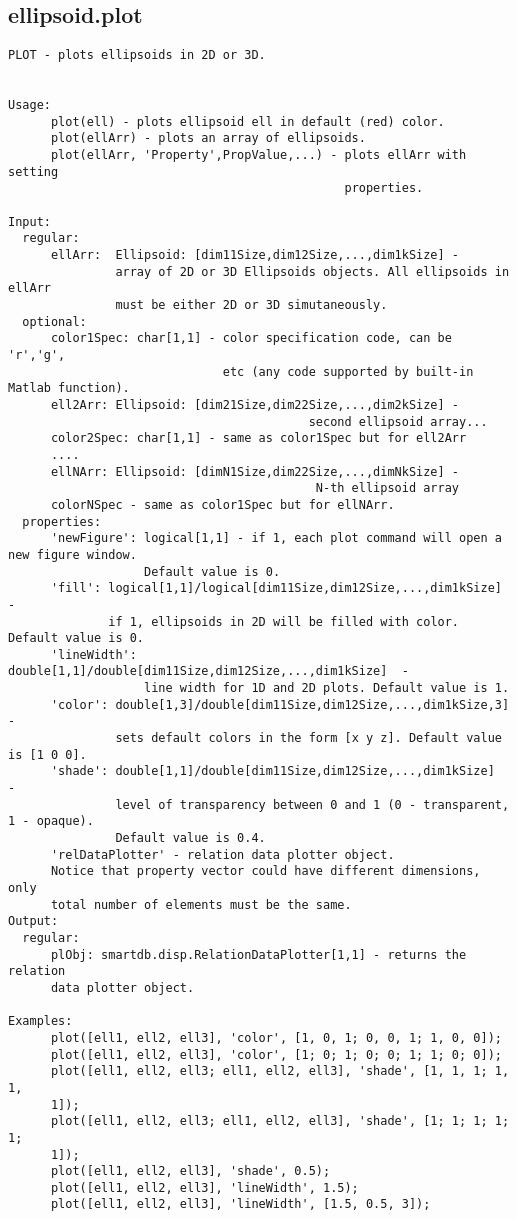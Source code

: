\subsection{\texorpdfstring{ellipsoid.plot}{plot}}\label{method:ellipsoid.plot}
\begin{verbatim}
PLOT - plots ellipsoids in 2D or 3D.


Usage:
      plot(ell) - plots ellipsoid ell in default (red) color.
      plot(ellArr) - plots an array of ellipsoids.
      plot(ellArr, 'Property',PropValue,...) - plots ellArr with setting
                                               properties.

Input:
  regular:
      ellArr:  Ellipsoid: [dim11Size,dim12Size,...,dim1kSize] -
               array of 2D or 3D Ellipsoids objects. All ellipsoids in ellArr
               must be either 2D or 3D simutaneously.
  optional:
      color1Spec: char[1,1] - color specification code, can be 'r','g',
                              etc (any code supported by built-in Matlab function).
      ell2Arr: Ellipsoid: [dim21Size,dim22Size,...,dim2kSize] -
                                          second ellipsoid array...
      color2Spec: char[1,1] - same as color1Spec but for ell2Arr
      ....
      ellNArr: Ellipsoid: [dimN1Size,dim22Size,...,dimNkSize] -
                                           N-th ellipsoid array
      colorNSpec - same as color1Spec but for ellNArr.
  properties:
      'newFigure': logical[1,1] - if 1, each plot command will open a new figure window.
                   Default value is 0.
      'fill': logical[1,1]/logical[dim11Size,dim12Size,...,dim1kSize]  -
              if 1, ellipsoids in 2D will be filled with color. Default value is 0.
      'lineWidth': double[1,1]/double[dim11Size,dim12Size,...,dim1kSize]  -
                   line width for 1D and 2D plots. Default value is 1.
      'color': double[1,3]/double[dim11Size,dim12Size,...,dim1kSize,3] -
               sets default colors in the form [x y z]. Default value is [1 0 0].
      'shade': double[1,1]/double[dim11Size,dim12Size,...,dim1kSize]  -
               level of transparency between 0 and 1 (0 - transparent, 1 - opaque).
               Default value is 0.4.
      'relDataPlotter' - relation data plotter object.
      Notice that property vector could have different dimensions, only
      total number of elements must be the same.
Output:
  regular:
      plObj: smartdb.disp.RelationDataPlotter[1,1] - returns the relation
      data plotter object.

Examples:
      plot([ell1, ell2, ell3], 'color', [1, 0, 1; 0, 0, 1; 1, 0, 0]);
      plot([ell1, ell2, ell3], 'color', [1; 0; 1; 0; 0; 1; 1; 0; 0]);
      plot([ell1, ell2, ell3; ell1, ell2, ell3], 'shade', [1, 1, 1; 1, 1,
      1]);
      plot([ell1, ell2, ell3; ell1, ell2, ell3], 'shade', [1; 1; 1; 1; 1;
      1]);
      plot([ell1, ell2, ell3], 'shade', 0.5);
      plot([ell1, ell2, ell3], 'lineWidth', 1.5);
      plot([ell1, ell2, ell3], 'lineWidth', [1.5, 0.5, 3]);
\end{verbatim}
